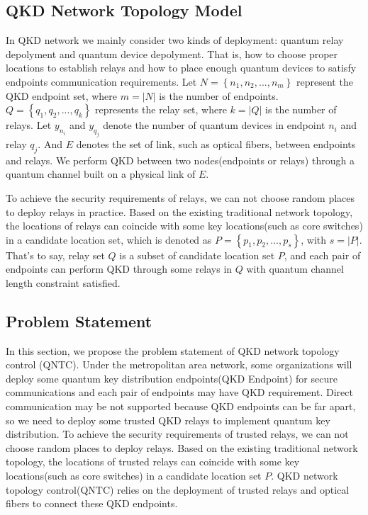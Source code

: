 
\subsection{QKD Network Topology Model}
In QKD network we mainly consider two kinds of deployment: quantum relay depolyment and quantum device depolyment. That is, how to choose proper locations to establish relays and how to place enough quantum devices to satisfy endpoints communication requirements. Let $N=\left\{n_1,n_2,...,n_m\right\}$ represent the QKD endpoint set, where $m=\left|N\right|$ is the number of endpoints. $Q=\left\{q_1,q_2,...,q_k\right\}$ represents the relay set, where $k=\left|Q\right|$ is the number of relays. Let $y_{n_i}$ and $y_{q_j}$ denote the number of quantum devices in endpoint $n_i$ and relay $q_j$. And $E$ denotes the set of link, such as optical fibers,  between endpoints and relays. We perform QKD between two nodes(endpoints or relays) through a quantum channel built on a physical link of $E$.

To achieve the security requirements of relays, we can not choose random places to deploy relays in practice. Based on the existing traditional network topology, the locations of relays can coincide with some key locations(such as core switches) in a candidate location set, which is denoted as $P=\left\{p_1,p_2,...,p_s\right\}$, with $s=\left|P\right|$. That's to say, relay set $Q$ is a subset of candidate location set $P$, and each pair of endpoints can perform QKD through some relays in $Q$ with quantum channel length constraint satisfied.


\subsection{Problem Statement}
In this section, we propose the problem statement of QKD network topology control (QNTC). Under the metropolitan area network, some organizations will deploy some quantum key distribution endpoints(QKD Endpoint) for secure communications and each pair of endpoints may have QKD requirement. Direct communication may be not supported because QKD endpoints can be far apart, so we need to deploy some trusted QKD relays to implement quantum key distribution. To achieve the security requirements of trusted relays, we can not choose random places to deploy relays. Based on the existing traditional network topology, the locations of trusted relays can coincide with some key locations(such as core switches) in a candidate location set $P$. QKD network topology control(QNTC) relies on the deployment of trusted relays and optical fibers to connect these QKD endpoints.


